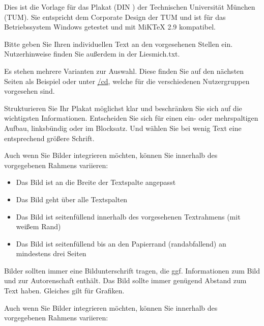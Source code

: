 
Dies ist die Vorlage für das Plakat (DIN \PlakatFormat{}) der Technischen
Universität München (TUM). Sie entspricht dem Corporate Design der TUM und ist für das Betriebssystem Windows getestet und mit MiKTeX 2.9 kompatibel.

Bitte geben Sie Ihren individuellen Text an den vorgesehenen Stellen ein. Nutzerhinweise finden Sie außerdem in der Liesmich.txt.

\ifx\PlakatBeschreibungKopfzeileUndAbsender\TRUE
{}

Es stehen mehrere Varianten zur Auswahl. Diese finden Sie auf den nächsten Seiten als Beispiel oder unter \href{http://\UniversitaetWebseite/cd}{\UniversitaetWebseite/cd}, welche für die verschiedenen Nutzergruppen vorgesehen sind.

\fi


Strukturieren Sie Ihr Plakat möglichst klar und beschränken Sie sich auf die wichtigsten Informationen. Entscheiden Sie sich für einen ein- oder mehrspaltigen Aufbau, linksbündig oder im Blocksatz. Und wählen Sie bei wenig Text eine entsprechend größere Schrift.


\ifx\PlakatBeschreibungKurz\TRUE %

Auch wenn Sie Bilder integrieren möchten, können Sie innerhalb des vorgegebenen Rahmens variieren:

\begin{itemize}
\item Das Bild ist an die Breite der Textspalte angepasst
\item Das Bild geht über alle Textspalten
\item Das Bild ist seitenfüllend innerhalb des vorgesehenen Textrahmens (mit weißem Rand)
\item Das Bild ist seitenfüllend bis an den Papierrand (randabfallend) an mindestens drei Seiten
\end{itemize}

Bilder sollten immer eine Bildunterschrift tragen, die ggf. Informationen zum Bild und zur Autorenschaft enthält.
Das Bild sollte immer genügend Abstand zum Text haben. Gleiches gilt für Grafiken.

\else

Auch wenn Sie Bilder integrieren möchten, können Sie innerhalb des vorgegebenen Rahmens variieren:

